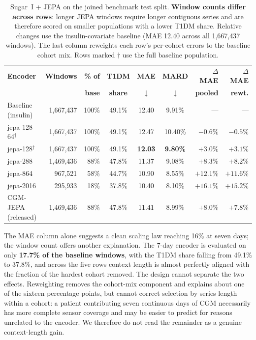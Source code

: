 \documentclass[11pt,a4paper]{article}
\begin{document}
\begin{table}[h]
\centering
\caption{Sugar~I + JEPA on the joined benchmark test split. \textbf{Window counts differ across rows}: longer JEPA windows require longer contiguous series and are therefore scored on smaller populations with a lower T1DM share. Relative changes use the insulin-covariate baseline (MAE 12.40 across all 1,667,437 windows). The last column reweights each row's per-cohort errors to the baseline cohort mix. Rows marked $\dagger$ use the full baseline population.}
\label{tab:sugar_jepa_test}
\small
\begin{tabular}{lrrcccrr}
\toprule
\textbf{Encoder} & \textbf{Windows} & \textbf{\% of} & \textbf{T1DM} & \textbf{MAE} & \textbf{MARD} & \textbf{$\Delta$MAE} & \textbf{$\Delta$MAE} \\
 & & \textbf{base} & \textbf{share} & $\downarrow$ & $\downarrow$ & \textbf{pooled} & \textbf{rewt.} \\
\midrule
Baseline (insulin) & 1,667,437 & 100\% & 49.1\% & 12.40 & 9.91\% & --- & --- \\
\midrule
jepa-128-64$^{\dagger}$ & 1,667,437 & 100\% & 49.1\% & 12.47 & 10.40\% & $-0.6\%$ & $-0.5\%$ \\
jepa-128$^{\dagger}$ & 1,667,437 & 100\% & 49.1\% & \textbf{12.03} & \textbf{9.80\%} & $+3.0\%$ & $+3.1\%$ \\
jepa-288 & 1,469,436 & 88\% & 47.8\% & 11.37 & 9.08\% & $+8.3\%$ & $+8.2\%$ \\
jepa-864 & 967,521 & 58\% & 44.7\% & 10.90 & 8.55\% & $+12.1\%$ & $+11.6\%$ \\
jepa-2016 & 295,933 & 18\% & 37.8\% & 10.40 & 8.10\% & $+16.1\%$ & $+15.2\%$ \\
\midrule
CGM-JEPA (released) & 1,469,436 & 88\% & 47.8\% & 11.41 & 8.99\% & $+8.0\%$ & $+7.8\%$ \\
\bottomrule
\end{tabular}
\end{table}

The MAE column alone suggests a clean scaling law reaching 16\% at seven days; the window count offers another explanation.
The 7-day encoder is evaluated on only \textbf{17.7\% of the baseline windows}, with the T1DM share falling from 49.1\% to 37.8\%, and across the five rows context length is almost perfectly aligned with the fraction of the hardest cohort removed.
The design cannot separate the two effects.
Reweighting removes the cohort-mix component and explains about one of the sixteen percentage points, but cannot correct selection by series length within a cohort: a patient contributing seven continuous days of CGM necessarily has more complete sensor coverage and may be easier to predict for reasons unrelated to the encoder.
We therefore do not read the remainder as a genuine context-length gain.
\end{document}
